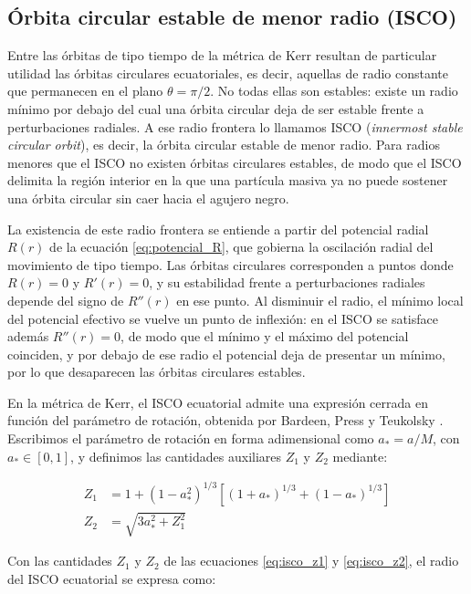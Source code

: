 \subsection{Órbita circular estable de menor radio (ISCO)}

Entre las órbitas de tipo tiempo de la métrica de Kerr resultan de particular utilidad las órbitas circulares ecuatoriales, es decir, aquellas de radio constante que permanecen en el plano $\theta = \pi/2$. No todas ellas son estables: existe un radio mínimo por debajo del cual una órbita circular deja de ser estable frente a perturbaciones radiales. A ese radio frontera lo llamamos ISCO (\textit{innermost stable circular orbit}), es decir, la órbita circular estable de menor radio. Para radios menores que el ISCO no existen órbitas circulares estables, de modo que el ISCO delimita la región interior en la que una partícula masiva ya no puede sostener una órbita circular sin caer hacia el agujero negro.

La existencia de este radio frontera se entiende a partir del potencial radial $R(r)$ de la ecuación \eqref{eq:potencial_R}, que gobierna la oscilación radial del movimiento de tipo tiempo. Las órbitas circulares corresponden a puntos donde $R(r) = 0$ y $R'(r) = 0$, y su estabilidad frente a perturbaciones radiales depende del signo de $R''(r)$ en ese punto. Al disminuir el radio, el mínimo local del potencial efectivo se vuelve un punto de inflexión: en el ISCO se satisface además $R''(r) = 0$, de modo que el mínimo y el máximo del potencial coinciden, y por debajo de ese radio el potencial deja de presentar un mínimo, por lo que desaparecen las órbitas circulares estables.

En la métrica de Kerr, el ISCO ecuatorial admite una expresión cerrada en función del parámetro de rotación, obtenida por Bardeen, Press y Teukolsky \cite{bardeen1972rotating}. Escribimos el parámetro de rotación en forma adimensional como $a_* = a/M$, con $a_* \in [0, 1]$, y definimos las cantidades auxiliares $Z_1$ y $Z_2$ mediante:

\begin{align}
    Z_1 &= 1 + (1 - a_*^2)^{1/3} \left[ (1 + a_*)^{1/3} + (1 - a_*)^{1/3} \right] \label{eq:isco_z1} \\
    Z_2 &= \sqrt{3 a_*^2 + Z_1^2} \label{eq:isco_z2}
\end{align}

Con las cantidades $Z_1$ y $Z_2$ de las ecuaciones \eqref{eq:isco_z1} y \eqref{eq:isco_z2}, el radio del ISCO ecuatorial se expresa como:

